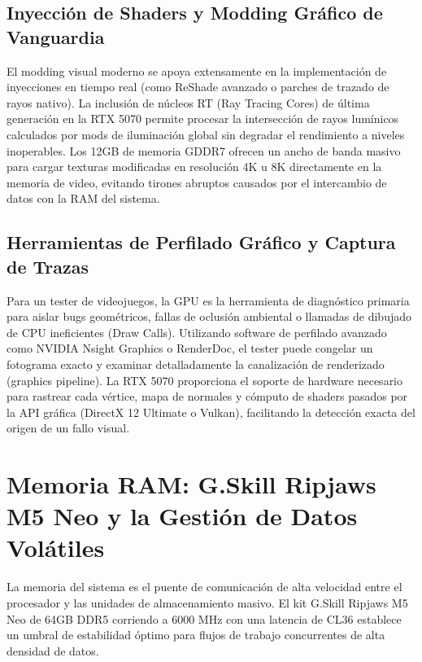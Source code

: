 \documentclass[12pt,a4paper]{article}
\begin{document}
\subsection{Inyección de Shaders y Modding Gráfico de Vanguardia}
El modding visual moderno se apoya extensamente en la implementación de inyecciones en tiempo real (como ReShade avanzado o parches de trazado de rayos nativo). La inclusión de núcleos RT (Ray Tracing Cores) de última generación en la RTX 5070 permite procesar la intersección de rayos lumínicos calculados por mods de iluminación global sin degradar el rendimiento a niveles inoperables. Los 12GB de memoria GDDR7 ofrecen un ancho de banda masivo para cargar texturas modificadas en resolución 4K u 8K directamente en la memoria de video, evitando tirones abruptos causados por el intercambio de datos con la RAM del sistema.

\subsection{Herramientas de Perfilado Gráfico y Captura de Trazas}
Para un tester de videojuegos, la GPU es la herramienta de diagnóstico primaria para aislar bugs geométricos, fallas de oclusión ambiental o llamadas de dibujado de CPU ineficientes (Draw Calls). Utilizando software de perfilado avanzado como NVIDIA Nsight Graphics o RenderDoc, el tester puede congelar un fotograma exacto y examinar detalladamente la canalización de renderizado (graphics pipeline). La RTX 5070 proporciona el soporte de hardware necesario para rastrear cada vértice, mapa de normales y cómputo de shaders pasados por la API gráfica (DirectX 12 Ultimate o Vulkan), facilitando la detección exacta del origen de un fallo visual.

\newpage

\section{Memoria RAM: G.Skill Ripjaws M5 Neo y la Gestión de Datos Volátiles}

La memoria del sistema es el puente de comunicación de alta velocidad entre el procesador y las unidades de almacenamiento masivo. El kit G.Skill Ripjaws M5 Neo de 64GB DDR5 corriendo a 6000 MHz con una latencia de CL36 establece un umbral de estabilidad óptimo para flujos de trabajo concurrentes de alta densidad de datos.
\end{document}
